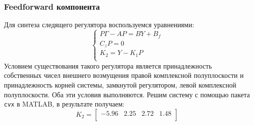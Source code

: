 \subsubsection{Feedforward компонента}
Для синтеза следящего регулятора воспользуемся уравнениями: 
\begin{equation}
    \begin{cases}
        P\Gamma - AP = BY + B_f \\ 
        C_z P = 0 \\ 
        K_2 = Y - K_1 P \\ 
    \end{cases}
\end{equation}
Условием существования такого регулятора является принадлежность собственных чисел 
внешнего возмущения правой комплексной полуплоскости и принадлежность корней 
системы, замкнутой регулятором, левой комплексной полуплоскости. Оба эти условия выполняются. 
Решим систему с помощью пакета \texttt{cvx} в MATLAB, в результате получаем:
\begin{equation}
    K_2 = \begin{bmatrix}
        -5.96  & 2.25  & 2.72  & 1.48 \\ 
    \end{bmatrix} 
\end{equation}

